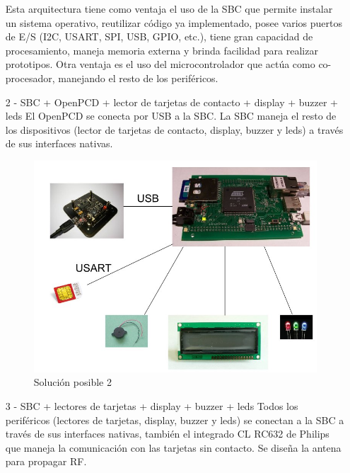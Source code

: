 \begin{itemize}
Esta arquitectura tiene como ventaja el uso de la SBC que permite instalar un sistema operativo, reutilizar código ya implementado, posee varios puertos de E/S (I2C, USART, SPI, USB, GPIO, etc.), tiene gran capacidad de procesamiento, maneja memoria externa y brinda facilidad para realizar prototipos. Otra ventaja es el uso del microcontrolador que actúa como co-procesador, manejando el resto de los periféricos.

\item[2 -] SBC + OpenPCD + lector de tarjetas de contacto + display + buzzer + leds
El OpenPCD se conecta por USB a la SBC. La SBC maneja el resto de los dispositivos (lector de tarjetas de contacto, display, buzzer y leds) a través de sus interfaces nativas.

\begin{figure}[H]
\centering
  \begin{center}
  \includegraphics[scale=.25]{Imagenes/2.jpg} 
  \end{center}
  \caption{Solución posible 2}\label{Fig:HW} 
\end{figure}

\newpage

\item[3 -] SBC + lectores de tarjetas + display + buzzer + leds
Todos los periféricos (lectores de tarjetas, display, buzzer y leds) se conectan a la SBC a través de sus interfaces nativas, también el integrado CL RC632 de Philips que maneja la comunicación con las tarjetas sin contacto. Se diseña la antena para propagar RF.


\end{itemize}
